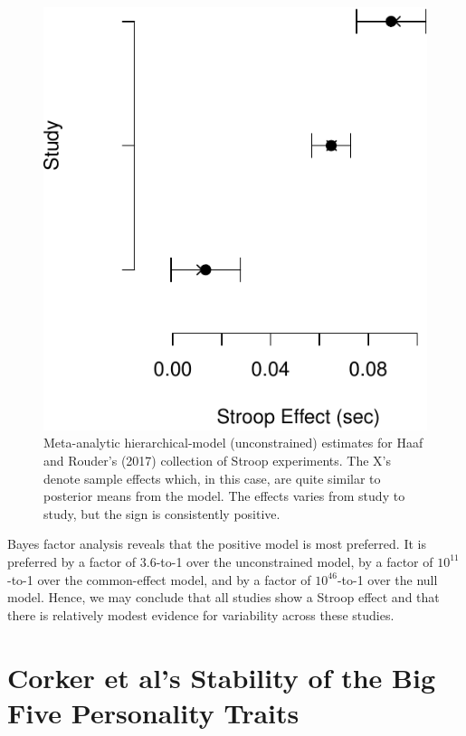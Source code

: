 \documentclass[english,man]{apa6}
\theoremstyle{definition}
\theoremstyle{definition}
\theoremstyle{remark}
\begin{document}
\begin{figure}[htbp]
\centering
\includegraphics{p_files/figure-latex/hrEst-1.pdf}
\caption{\label{fig:hrEst}Meta-analytic hierarchical-model (unconstrained)
estimates for Haaf and Rouder's (2017) collection of Stroop experiments.
The X's denote sample effects which, in this case, are quite similar to
posterior means from the model. The effects varies from study to study,
but the sign is consistently positive.}
\end{figure}

Bayes factor analysis reveals that the positive model is most preferred.
It is preferred by a factor of 3.6-to-1 over the unconstrained model, by
a factor of \(10^{11}\)-to-1 over the common-effect model, and by a
factor of \(10^{46}\)-to-1 over the null model. Hence, we may conclude
that all studies show a Stroop effect and that there is relatively
modest evidence for variability across these studies.

\section{Corker et al's Stability of the Big Five Personality
Traits}\label{corker-et-als-stability-of-the-big-five-personality-traits}
\end{document}

